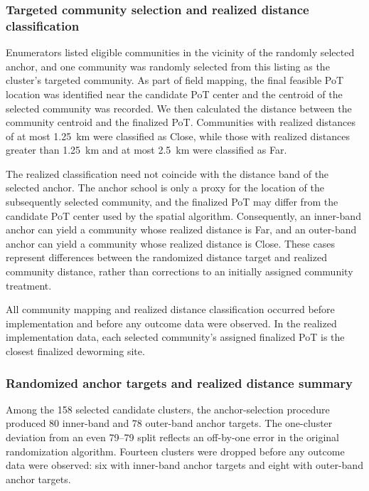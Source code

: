\documentclass[ECM\space ReStud.tex]{subfiles}
\begin{document}
\subsubsection*{Targeted community selection and realized distance classification}

Enumerators listed eligible communities in the vicinity of the randomly selected anchor, and one community was randomly selected from this listing as the cluster's targeted community. As part of field mapping, the final feasible PoT location was identified near the candidate PoT center and the centroid of the selected community was recorded. We then calculated the distance between the community centroid and the finalized PoT. Communities with realized distances of at most 1.25~km were classified as Close, while those with realized distances greater than 1.25~km and at most 2.5~km were classified as Far.

The realized classification need not coincide with the distance band of the selected anchor. The anchor school is only a proxy for the location of the subsequently selected community, and the finalized PoT may differ from the candidate PoT center used by the spatial algorithm. Consequently, an inner-band anchor can yield a community whose realized distance is Far, and an outer-band anchor can yield a community whose realized distance is Close. These cases represent differences between the randomized distance target and realized community distance, rather than corrections to an initially assigned community treatment.

All community mapping and realized distance classification occurred before implementation and before any outcome data were observed. In the realized implementation data, each selected community's assigned finalized PoT is the closest finalized deworming site.

\subsubsection*{Randomized anchor targets and realized distance summary}

Among the 158 selected candidate clusters, the anchor-selection procedure produced 80 inner-band and 78 outer-band anchor targets. The one-cluster deviation from an even 79--79 split reflects an off-by-one error in the original randomization algorithm. Fourteen clusters were dropped before any outcome data were observed: six with inner-band anchor targets and eight with outer-band anchor targets.
\end{document}
